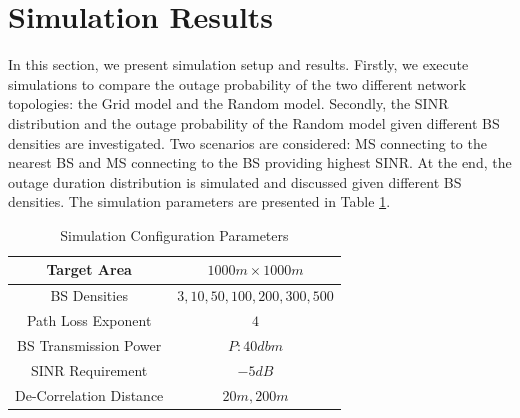 \documentclass[journal,10pt]{IEEEtran}
\begin{document}
 \section{Simulation Results}
 \label{4:SimuProb}
 \par In this section, we present simulation setup and results. Firstly, we execute simulations to compare the outage probability of the two different network topologies: the Grid model and the Random model. Secondly, the SINR distribution and the outage probability of the Random model given different BS densities are investigated. Two scenarios are considered: MS connecting to the nearest BS and MS connecting to the BS providing highest SINR. At the end, the outage duration distribution is simulated and discussed given different BS densities. The simulation parameters are presented in Table \ref{SystemConfig2}. 
 \begin{table}
 \centering
 \caption{\label{SystemConfig2}Simulation Configuration Parameters}

 \begin{tabular}{|c|c|}

 \hline
 Target Area & $1000m\times 1000m$\\
 \hline
 BS Densities & $3, 10, 50, 100, 200, 300, 500$\\
 \hline
 Path Loss Exponent & $4$\\
 \hline
 BS Transmission Power & $P: 40dbm$\\
 \hline
 SINR Requirement & $-5dB$\\
 \hline
 De-Correlation Distance & $20m, 200m$\\
 \hline
 \end{tabular}

 \end{table}
\end{document}
